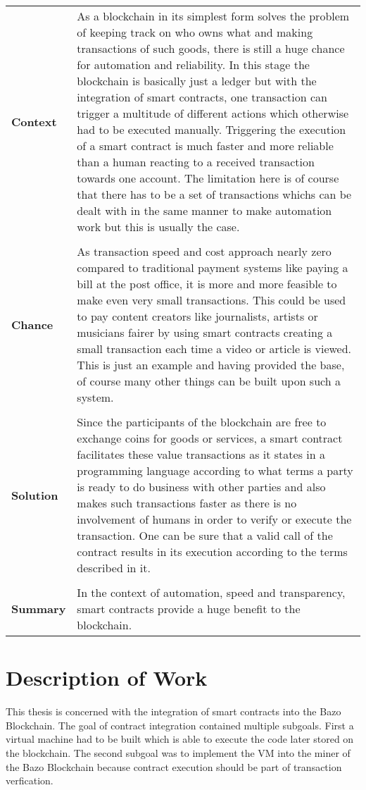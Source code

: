 \begin{tabular}[t]{ p{3cm} p{12.5cm}}
\textbf{Context} &
As a blockchain in its simplest form solves the problem of keeping track on who owns what and making transactions of such goods, there is still a huge chance for automation and reliability. In this stage the blockchain is basically just a ledger but with the integration of smart contracts, one transaction can trigger a multitude of different actions which otherwise had to be executed manually. Triggering the execution of a smart contract is much faster and more reliable than a human reacting to a received transaction towards one account. The limitation here is of course that there has to be a set of transactions whichs can be dealt with in the same manner to make automation work but this is usually the case. \\ \\

\textbf{Chance} &
As transaction speed and cost approach nearly zero compared to traditional payment systems like paying a bill at the post office, it is more and more feasible to make even very small transactions. This could be used to pay content creators like journalists, artists or musicians fairer by using smart contracts creating a small transaction each time a video or article is viewed. This is just an example and having provided the base, of course many other things can be built upon such a system.\\ \\

\textbf{Solution} &
Since the participants of the blockchain are free to exchange coins for goods or services, a smart contract facilitates these value transactions as it states in a programming language according to what terms a party is ready to do business with other parties and also makes such transactions faster as there is no involvement of humans in order to verify or execute the transaction. One can be sure that a valid call of the contract results in its execution according to the terms described in it. \\ \\

\textbf{Summary} &
In the context of automation, speed and transparency, smart contracts provide a huge benefit to the blockchain.

\end{tabular}

\section{Description of Work}
\label{descriptionofwork}
This thesis is concerned with the integration of smart contracts into the Bazo Blockchain. The goal of contract integration contained multiple subgoals. First a virtual machine had to be built which is able to execute the code later stored on the blockchain. The second subgoal was to implement the VM into the miner of the Bazo Blockchain because contract execution should be part of transaction verfication.
